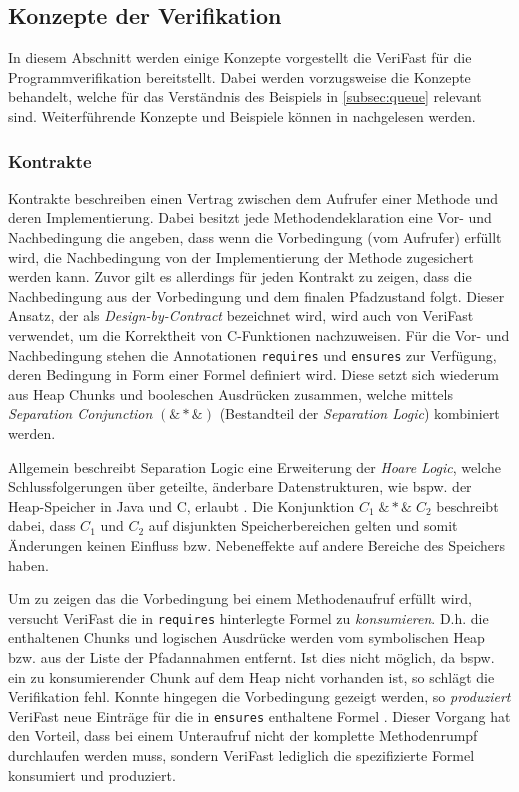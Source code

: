 \subsection{Konzepte der Verifikation}
\label{subsec:vflang}

In diesem Abschnitt werden einige Konzepte vorgestellt die VeriFast für die Programmverifikation bereitstellt. Dabei werden vorzugsweise die Konzepte behandelt, welche für das Verständnis des Beispiels in \cref{subsec:queue} relevant sind. Weiterführende Konzepte und Beispiele können in \cite{Jacobs2017} nachgelesen werden.

\subsubsection{Kontrakte}

Kontrakte beschreiben einen Vertrag zwischen dem Aufrufer einer Methode und deren Implementierung. Dabei besitzt jede Methodendeklaration eine Vor- und Nachbedingung die angeben, dass wenn die Vorbedingung (vom Aufrufer) erfüllt wird, die Nachbedingung von der Implementierung der Methode zugesichert werden kann. Zuvor gilt es allerdings für jeden Kontrakt zu zeigen, dass die Nachbedingung aus der Vorbedingung und dem finalen Pfadzustand folgt. Dieser Ansatz, der als \emph{Design-by-Contract} bezeichnet wird, wird auch von VeriFast verwendet, um die Korrektheit von C-Funktionen nachzuweisen. Für die Vor- und Nachbedingung stehen die Annotationen \texttt{requires} und \texttt{ensures} zur Verfügung, deren Bedingung in Form einer Formel definiert wird. Diese setzt sich wiederum aus Heap Chunks und booleschen Ausdrücken zusammen, welche mittels \emph{Separation Conjunction} $(\&{*}\&)$ (Bestandteil der \emph{Separation Logic}) kombiniert werden.

Allgemein beschreibt Separation Logic eine Erweiterung der \emph{Hoare Logic}, welche Schlussfolgerungen über geteilte, änderbare Datenstrukturen, wie bspw. der Heap-Speicher in Java und C, erlaubt \cite{Reynolds2002}. Die Konjunktion $C_{1} \; \&{*}\& \; C_{2}$ beschreibt dabei, dass $C_{1}$ und $C_{2}$ auf disjunkten Speicherbereichen gelten und somit Änderungen keinen Einfluss bzw. Nebeneffekte auf andere Bereiche des Speichers haben.

Um zu zeigen das die Vorbedingung bei einem Methodenaufruf erfüllt wird, versucht VeriFast die in \texttt{requires} hinterlegte Formel zu \emph{konsumieren}. D.h. die enthaltenen Chunks und logischen Ausdrücke werden vom symbolischen Heap bzw. aus der Liste der Pfadannahmen entfernt. Ist dies nicht möglich, da bspw. ein zu konsumierender Chunk auf dem Heap nicht vorhanden ist, so schlägt die Verifikation fehl. Konnte hingegen die Vorbedingung gezeigt werden, so \emph{produziert} VeriFast neue Einträge für die in \texttt{ensures} enthaltene Formel \cite{Jacobs2017}. Dieser Vorgang hat den Vorteil, dass bei einem Unteraufruf nicht der komplette Methodenrumpf durchlaufen werden muss, sondern VeriFast lediglich die spezifizierte Formel konsumiert und produziert.

